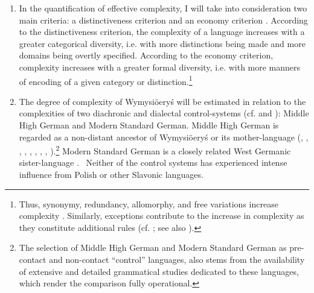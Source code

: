 \documentclass[output=paper,hidelinks]{langscibook}
\begin{document}
\begin{enumerate}
\item
In the quantification of effective complexity, I will take into consideration two main criteria: a distinctiveness criterion and an economy criterion \citep{miestamo_complexity_2006, miestamo_feasibility_2006, miestamo_grammatical_2008, sinnemaki_complexity_2008, sinnemaki_complexity_2009, sinnemaki_language_2011, parkvall_simplicity_2008}. According to the distinctiveness criterion, the complexity of a language increases with a greater categorical diversity, i.e. with more distinctions being made and more domains being overtly specified. According to the economy criterion, complexity increases with a greater formal diversity, i.e. with more manners of encoding of a given category or distinction.\footnote{Thus, synonymy, redundancy, allomorphy, and free variations increase complexity \citep{mcwhorter_language_2007, mcwhorter_why_2008}. Similarly, exceptions contribute to the increase in complexity as they constitute additional rules (cf. \citealt[29]{hammarstrom_complexity_2008}; see also \citealt{mcwhorter_language_2007, mcwhorter_why_2008}).} 

\item
The degree of complexity of Wymysiöeryś will be estimated in relation to the complexities of two diachronic and dialectal control-systems (cf. \citealt{deutscher_overall_2009} and \citealt{dahl_testing_2009}): Middle High German and Modern Standard German. Middle High German is regarded as a non-distant ancestor of Wymysiöeryś or its mother-language (\citealt{kleczkowski_dialekt_1920}, \citealt[496, 498]{wiesinger_deutsche_1980}, \citeyear[911]{wiesinger1983deutsche}, \citealt{morciniec_flamische_1984}, \citealt[308]{zieniukowa_-pyjter-jaska_1997}, \citeyear[492--493]{zieniukowa_sutuacja_2001}, \citealt[200]{wicherkiewicz_wir_1998}, \citealt[19]{wicherkiewicz_researching_2016}, \citealt[132]{zak_influence_2016}).\footnote{The selection of Middle High German and Modern Standard German as pre-contact and non-contact ``control'' languages, also stems from the availability of extensive and detailed grammatical studies dedicated to these languages, which render the comparison fully operational.} Modern Standard German is a closely related West Germanic sister-language \citep{chromik_halcnovian_2013}.%
~Neither of the control systems has experienced intense influence from Polish or other Slavonic languages. 


\end{enumerate}
\end{document}
